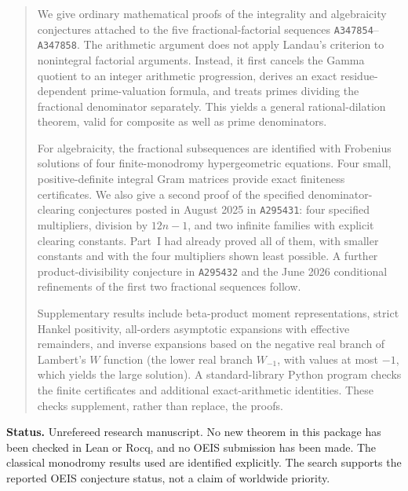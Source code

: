 \documentclass[11pt]{article}
\theoremstyle{definition}
\theoremstyle{remark}
\newcommand{\OEIS}[1]{\texttt{#1}}
\begin{document}
\begin{quote}\small
We give ordinary mathematical proofs of the integrality and algebraicity
conjectures attached to the five fractional-factorial sequences
\OEIS{A347854}--\OEIS{A347858}. The arithmetic argument does not apply
Landau's criterion to nonintegral factorial arguments. Instead, it first
cancels the Gamma quotient to an integer arithmetic progression, derives an
exact residue-dependent prime-valuation formula, and treats primes dividing
the fractional denominator separately. This yields a general rational-dilation
theorem, valid for composite as well as prime denominators.

For algebraicity, the fractional subsequences are identified with Frobenius
solutions of four finite-monodromy hypergeometric equations. Four small,
positive-definite integral Gram matrices provide exact finiteness certificates.
We also give a second proof of the specified denominator-clearing conjectures
posted in August 2025 in \OEIS{A295431}: four specified multipliers, division
by $12n-1$, and two infinite families with explicit clearing constants. Part~I
had already proved all of them, with smaller constants and with the four
multipliers shown least possible. A further product-divisibility conjecture in
\OEIS{A295432} and the June 2026 conditional refinements of the first two
fractional sequences follow.

Supplementary results include beta-product moment representations, strict
Hankel positivity, all-orders asymptotic expansions with effective remainders,
and inverse expansions based on the negative real branch of Lambert's $W$
function (the lower real branch $W_{-1}$, with values at most $-1$, which
yields the large solution). A standard-library Python program checks the
finite certificates and additional exact-arithmetic identities. These checks
supplement, rather than replace, the proofs.
\end{quote}

\noindent\textbf{Status.} Unrefereed research manuscript. No new theorem in this
package has been checked in Lean or Rocq, and no OEIS submission has been made.
The classical monodromy results used are identified explicitly. The search
supports the reported OEIS conjecture status, not a claim of worldwide priority.
\end{document}
